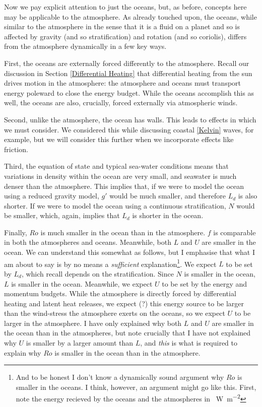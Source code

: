 Now we pay explicit attention to just the oceans, but, as before, concepts here may be applicable to the atmosphere. As already touched upon, the oceans, while similar to the atmosphere in the sense that it is a fluid on a planet and so is affected by gravity (and so stratification) and rotation (and so coriolis), differs from the atmosphere dynamically in a few key ways.

First, the oceans are externally forced differently to the atmosphere. Recall our discussion in Section \ref{Differential Heating} that differential heating from the sun drives motion in the atmosphere: the atmosphere and oceans must transport energy poleward to close the energy budget. While the oceans accomplish this as well, the oceans are also, crucially, forced externally via atmospheric winds.

Second, unlike the atmosphere, the ocean has walls. This leads to effects in which we must consider. We considered this while discussing coastal \ref{Kelvin} waves, for example, but we will consider this further when we incorporate effects like friction.

Third, the equation of state and typical sea-water conditions means that variations in density within the ocean are very small, and seawater is much denser than the atmosphere. This implies that, if we were to model the ocean using a reduced gravity model, \(g'\) would be much smaller, and therefore \(L_d\) is also shorter. If we were to model the ocean using a continuous stratification, \(N\) would be smaller, which, again, implies that \(L_d\) is shorter in the ocean.

Finally, \(Ro\) is much smaller in the ocean than in the atmosphere. \(f\) is comparable in both the atmospheres and oceans. Meanwhile, both \(L\) and \(U\) are smaller in the ocean. We can understand this somewhat as follows, but I emphasise that what I am about to say is by no means a \textit{sufficient} explanation\footnote{And to be honest I don't know a dynamically sound argument why \(Ro\) is smaller in the oceans. I think, however, an argument might go like this. First, note the energy recieved by the oceans and the atmospheres in \qty{}{\watt\per\square\meter}}. We expect \(L\) to be set by \(L_d\), which recall depends on the stratification. Since \(N\) is smaller in the ocean, \(L\) is smaller in the ocean. Meanwhile, we expect \(U\) to be set by the energy and momentum budgets. While the atmosphere is directly forced by differential heating and latent heat releases, we expect (?) this energy source to be larger than the wind-stress the atmosphere exerts on the oceans, so we expect \(U\) to be larger in the atmosphere. I have only explained why both \(L\) and \(U\) are smaller in the ocean than in the atmospheres, but note crucially that I have not explained why \(U\) is smaller by a larger amount than \(L\), and \textit{this} is what is required to explain why \(Ro\) is smaller in the ocean than in the atmosphere.


